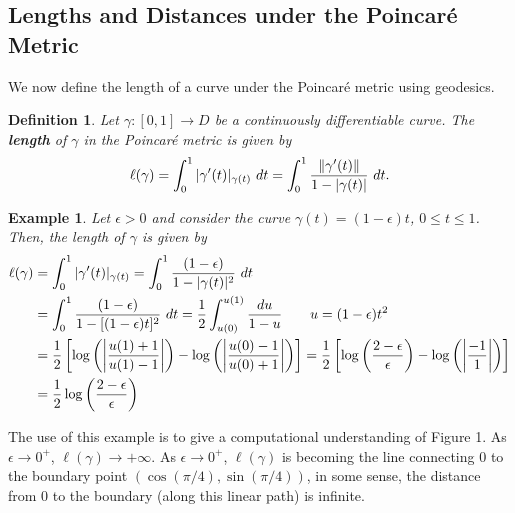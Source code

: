 \documentclass[10pt]{article}
\theoremstyle{plain}
\newtheorem{definition}{Definition}
\newtheorem{example}{Example}
\begin{document}
	\subsection*{Lengths and Distances under the Poincaré Metric}
	We now define the length of a curve under the Poincaré metric using geodesics. 
		\begin{definition}
			Let $\gamma: [0, 1] \to D$ be a continuously differentiable curve. The \textbf{\textit{length}} of $\gamma$ in the Poincaré metric is given by $$\ell(\gamma) = \int_0^1 |\gamma'(t)|_{\gamma(t)} \ dt = \int_0^1 \frac{\norm{\gamma'(t)}}{1 - |\gamma(t)|} \ dt.$$ 
		\end{definition} 
	
		\begin{example}
			Let $\epsilon > 0$ and consider the curve $\gamma(t) = (1 - \epsilon)t$, $0 \leq t \leq 1$. Then, the length of $\gamma$ is given by
				\begin{align*}
					\ell(\gamma) &= \int_0^1 |\gamma'(t)|_{\gamma(t)} = \int_0^1 \frac{(1 - \epsilon)}{1 - |\gamma(t)|^2} \ dt \\
					&= \int_0^1 \frac{(1 - \epsilon)}{1 - [(1 - \epsilon)t]^2} \ dt = \frac{1}{2}\int_{u(0)}^{u(1)} \frac{du}{1 - u} \qquad u = (1 - \epsilon)t^2 \\ 
					&=  \frac{1}{2} \left[\log \left(\abs{\frac{u(1) + 1}{u(1) - 1}}\right) - \log\left(\abs{\frac{u(0) - 1}{u(0) + 1}}\right)\right] = \frac{1}{2}\left[ \log\left(\frac{2 - \epsilon}{\epsilon}\right) - \log\left(\abs{\frac{-1}{1}}\right) \right]\\
					&= \frac{1}{2} \log \left(\frac{2 - \epsilon}{\epsilon}\right)
				\end{align*} 
			
		\end{example}
		
		The use of this example is to give a computational understanding of Figure 1. As $\epsilon \to 0^+$, $\ell(\gamma) \to +\infty$. As $\epsilon \to 0^+$, $\ell(\gamma)$ is becoming the line connecting $0$ to the boundary point $(\cos(\pi/4), \sin(\pi/4))$, in some sense, the distance from 0 to the boundary (along this linear path) is infinite. 
		
\end{document}
